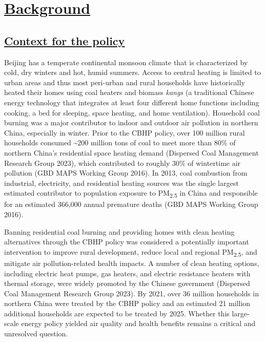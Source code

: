 \documentclass[
  letterpaper,
  DIV=11,
  numbers=noendperiod]{scrartcl}
\providecommand{\DIFadd}[1]{{\protect\color{blue}\underline{#1}}} %
\providecommand{\DIFaddbegin}{} %
\providecommand{\DIFaddend}{} %
\providecommand{\DIFdelbegin}{} %
\providecommand{\DIFdelend}{} %
\newcommand{\DIFscaledelfig}{0.5}
\newlength{\DIFdelgraphicswidth} %
\newlength{\DIFdelgraphicsheight} %
\newcommand{\DIFaddincludegraphics}[2][]{{\color{blue}\fbox{\DIFOincludegraphics[#1]{#2}}}} %
\newcommand{\DIFdelincludegraphics}[2][]{%
\sbox{\DIFdelgraphicsbox}{\DIFOincludegraphics[#1]{#2}}%
\settoboxwidth{\DIFdelgraphicswidth}{\DIFdelgraphicsbox} %
\settoboxtotalheight{\DIFdelgraphicsheight}{\DIFdelgraphicsbox} %
\scalebox{\DIFscaledelfig}{%
\parbox[b]{\DIFdelgraphicswidth}{\usebox{\DIFdelgraphicsbox}\\[-\baselineskip] \rule{\DIFdelgraphicswidth}{0em}}\llap{\resizebox{\DIFdelgraphicswidth}{\DIFdelgraphicsheight}{%
\setlength{\unitlength}{\DIFdelgraphicswidth}%
\begin{picture}(1,1)%
\thicklines\linethickness{2pt} %
{\color[rgb]{1,0,0}\put(0,0){\framebox(1,1){}}}%
{\color[rgb]{1,0,0}\put(0,0){\line( 1,1){1}}}%
{\color[rgb]{1,0,0}\put(0,1){\line(1,-1){1}}}%
\end{picture}%
}\hspace*{3pt}}} %
} %
\DeclareRobustCommand{\DIFaddbegin}{\DIFOaddbegin \let\includegraphics\DIFaddincludegraphics} %
\DeclareRobustCommand{\DIFaddend}{\DIFOaddend \let\includegraphics\DIFOincludegraphics} %
\DeclareRobustCommand{\DIFdelbegin}{\DIFOdelbegin \let\includegraphics\DIFdelincludegraphics} %
\DeclareRobustCommand{\DIFdelend}{\DIFOaddend \let\includegraphics\DIFOincludegraphics} %
\begin{document}
\DIFdelbegin %
\DIFdelend \DIFaddbegin \section{\DIFadd{Background}}\label{background}
\DIFaddend 

\DIFdelbegin %
\DIFdelend \DIFaddbegin \subsection{\DIFadd{Context for the policy}}\label{context-for-the-policy}
\DIFaddend 

Beijing has a temperate continental monsoon climate that is
characterized by cold, dry winters and hot, humid summers. Access to
central heating is limited to urban areas and thus most peri-urban and
rural households have historically heated their homes using coal heaters
and biomass \emph{kangs} (a traditional Chinese energy technology that
integrates at least four different home functions including cooking, a
bed for sleeping, space heating, and home ventilation). Household coal
burning was a major contributor to indoor and outdoor air pollution in
northern China, especially in winter. Prior to the CBHP policy, over 100
million rural households consumed \textasciitilde200 million tons of
coal to meet more than 80\% of northern China's residential space
heating demand (Dispersed Coal Management Research Group 2023), which
contributed to roughly 30\% of wintertime air pollution (GBD MAPS
Working Group 2016). In 2013, coal combustion from industrial,
electricity, and residential heating sources was the single largest
estimated contributor to population exposure to PM\textsubscript{2.5} in
China and responsible for an estimated 366,000 annual premature deaths
(GBD MAPS Working Group 2016).

Banning residential coal burning and providing homes with clean heating
alternatives through the CBHP policy was considered a potentially
important intervention to improve rural development, reduce local and
regional PM\textsubscript{2.5}, and mitigate air pollution-related
health impacts. A number of clean heating options, including electric
heat pumps, gas heaters, and electric resistance heaters with thermal
storage, were widely promoted by the Chinese government (Dispersed Coal
Management Research Group 2023). By 2021, over 36 million households in
northern China were treated by the CBHP policy and an estimated 21
million additional households are expected to be treated by 2025.
Whether this large-scale energy policy yielded air quality and health
benefits remains a critical and unresolved question.
\end{document}
